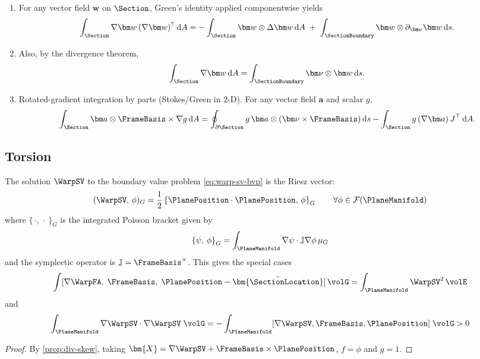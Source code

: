 \begin{enumerate}
\item For any vector field \(\bm w\) on \(\Section\), Green’s identity applied componentwise yields
\begin{equation}
\int_{\Section}\nabla\bm w\,(\nabla\bm w)^{\!\top}\,\mathrm dA
= -\int_{\Section}\bm w\otimes \Delta\bm w\,\mathrm dA
\;+\;\int_{\SectionBoundary}\bm w\otimes \partial_{\bm\nu}\bm w\,\mathrm ds.
\label{eq:thm-green-vec}
\end{equation}
\item Also, by the divergence theorem,
\begin{equation}
\int_{\Section}\nabla\bm w\,\mathrm dA
=\int_{\SectionBoundary}\bm\nu\otimes\bm w\,\mathrm ds.
\label{eq:div-thm-vec}
\end{equation}
\item Rotated-gradient integration by parts (Stokes/Green in 2-D). For any vector field \(\bm a\) and scalar \(g\),
\begin{equation}
\int_{\Section}\bm a\otimes\FrameBasis\times\nabla g\,\mathrm{d}A
=\oint_{\partial\Section} g\,\bm a\otimes(\bm\nu\times\FrameBasis)\,\mathrm ds
-\int_{\Section} g\,(\nabla\bm a)\,J^{\top}\,\mathrm{d}A.
\label{eq:thm-stokes-green}
\end{equation}
\end{enumerate}

\subsection{Torsion}
\begin{proposition}
\label{prop:armero-81}
The solution \(\WarpSV\) to the boundary value problem \eqref{eq:warp-sv-bvp} is the Riesz vector:
\begin{equation}
    (\WarpSV,\, \phi)_G =  \frac{1}{2} \left\{\PlanePosition \cdot \PlanePosition,\, \phi\right\}_G %
    \qquad \forall \phi \in \mathcal{F}(\PlaneManifold)
\end{equation}
where \(\{\,\cdot,\,\cdot\,\}_G\) is the integrated Poisson bracket \citep{arnold1978mathematical} given by 
\[
\left\{\psi,\, \phi\right\}_G = \int_{\PlaneManifold} \nabla \psi \cdot \mathbb{J} \nabla \phi \, \mu_G
\]
and the symplectic operator is \(\mathbb{J} = \FrameBasis^{\times}\).
This gives the special cases 
%
\begin{equation}
\int [ \nabla \WarpFA,\; \FrameBasis,\; \PlanePosition - \tilde{\bm{\SectionLocation}} ] \, \volG
= \int_{\PlaneManifold} \WarpSV^2 \, \volE %
\label{eq:FA81b}
\end{equation}
and
\begin{equation}
\int_{\PlaneManifold} \nabla \WarpSV \cdot \nabla \WarpSV \; \volG 
= - \int_{\PlaneManifold} [\nabla \WarpSV, \FrameBasis, \PlanePosition] \; \volG > 0
\label{eq:FA103}
\end{equation}
\end{proposition}
\begin{proof}
By \cref{prop:div-skew}, taking \(\bm{X} = \nabla \WarpSV + \FrameBasis \times \PlanePosition\), \(f = \phi\) and \(g = 1\).
\end{proof}

